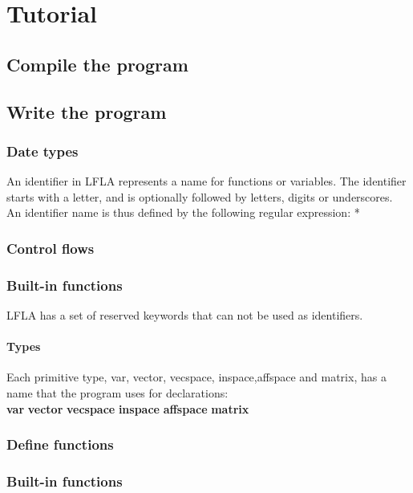 \documentclass[12pt]{article} %
\begin{document}
\tableofcontents
\newpage

\section{Tutorial}
\subsection{Compile the program}


\subsection{Write the program}

\subsubsection{Date types}
An identifier in LFLA represents a name for functions or variables. The identifier starts with a letter, and is optionally followed by letters, digits or underscores. An identifier name is thus defined
by the following regular expression:  
\newline
['a' - 'z' 'A' -'Z' ] ['a' - 'z' 'A' - 'Z' '0' - '9' '\_']*

\subsubsection{Control flows} 

\subsubsection{Built-in functions}
LFLA has a set of reserved keywords that can not be used as identifiers.
\paragraph{Types} Each primitive type, var, vector, vecspace, inspace,affspace and matrix, has a name that the program
uses for declarations:\\
\textbf{var}  \quad  \textbf{vector}  \quad\textbf{vecspace} \quad\textbf{ inspace} \quad \textbf{affspace} \quad \textbf{matrix} 

\subsubsection{Define functions}

\subsubsection{Built-in functions} 
\end{document}
